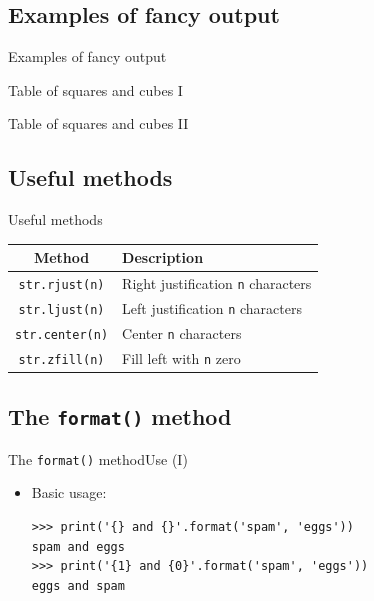 \documentclass[10pt,compress]{beamer} %
\begin{document}
\subsection{Examples of fancy output}
\begin{frame}{Examples of fancy output}{}
	\begin{block}{Table of squares and cubes I}
	\vspace{-0.2cm}
	
	\vspace{-0.2cm}
	\end{block}

	\begin{block}{Table of squares and cubes II}
	\vspace{-0.2cm}
	
	\vspace{-0.2cm}
	\end{block}
\end{frame}

\subsection{Useful methods}
\begin{frame}{Useful methods}{}

	\begin{tabular}{c|l}\hline
  	\sc Method & \sc Description  \\\hline
  	\texttt{str.rjust(n)} & Right justification \texttt{n} characters \\
  	\texttt{str.ljust(n)} & Left justification \texttt{n} characters \\
  	\texttt{str.center(n)} & Center \texttt{n} characters \\
  	\texttt{str.zfill(n)} & Fill left with \texttt{n} zero \\\hline
  	\end{tabular}

\end{frame}

\subsection{The \texttt{format()} method}
\begin{frame}[fragile]{The \texttt{format()} method}{Use (I)}
\begin{itemize}	
\item Basic usage:
	\begin{verbatim}
>>> print('{} and {}'.format('spam', 'eggs'))
spam and eggs
>>> print('{1} and {0}'.format('spam', 'eggs'))
eggs and spam
\end{verbatim}
\end{itemize}
\end{frame}
\end{document}
